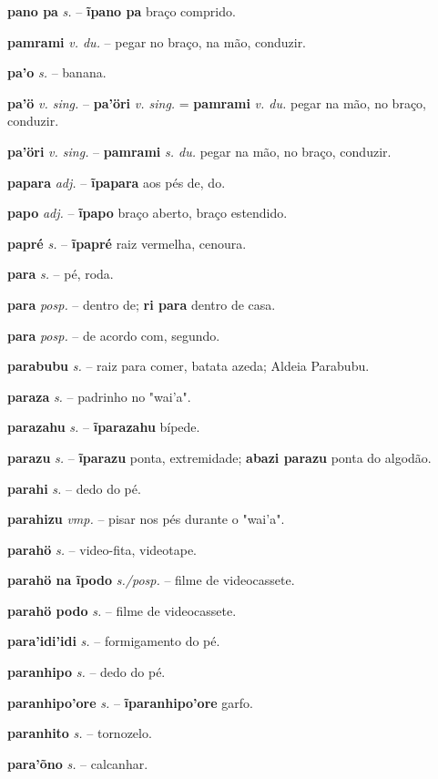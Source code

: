 \textbf{pano pa} \textit{s.} -- \textbf{ĩpano pa} braço comprido.

\textbf{pamrami} \textit{v. du.} -- pegar no braço, na mão, conduzir.

\textbf{pa'o} \textit{s.} -- banana.

\textbf{pa'ö} \textit{v. sing.} -- \textbf{pa'öri} \textit{v. sing.} = \textbf{pamrami} \textit{v. du.} pegar na mão, no braço, conduzir.

\textbf{pa'öri} \textit{v. sing.} -- \textbf{pamrami} \textit{s. du.} pegar na mão, no braço, conduzir.

\textbf{papara} \textit{adj.} -- \textbf{ĩpapara} aos pés de, do.

\textbf{papo} \textit{adj.} -- \textbf{ĩpapo} braço aberto, braço estendido.

\textbf{papré} \textit{s.} -- \textbf{ĩpapré} raiz vermelha, cenoura.

\textbf{para} \textit{s.} -- pé, roda.

\textbf{para} \textit{posp.} -- dentro de; \textbf{ri para} dentro de casa.

\textbf{para} \textit{posp.} -- de acordo com, segundo.

\textbf{parabubu} \textit{s.} -- raiz para comer, batata azeda; Aldeia Parabubu.

\textbf{paraza} \textit{s.} -- padrinho no "wai'a".

\textbf{parazahu} \textit{s.} -- \textbf{ĩparazahu} bípede.

\textbf{parazu} \textit{s.} -- \textbf{ĩparazu} ponta, extremidade; \textbf{abazi parazu} ponta do algodão.

\textbf{parahi} \textit{s.} -- dedo do pé.

\textbf{parahizu} \textit{vmp.} -- pisar nos pés durante o "wai'a".

\textbf{parahö} \textit{s.} -- video-fita, videotape.

\textbf{parahö na ĩpodo} \textit{s./posp.} -- filme de videocassete.

\textbf{parahö podo} \textit{s.} -- filme de videocassete.

\textbf{para'idi'idi} \textit{s.} -- formigamento do pé.

\textbf{paranhipo} \textit{s.} -- dedo do pé.

\textbf{paranhipo'ore} \textit{s.} -- \textbf{ĩparanhipo'ore} garfo.

\textbf{paranhito} \textit{s.} -- tornozelo.

\textbf{para'õno} \textit{s.} -- calcanhar.


